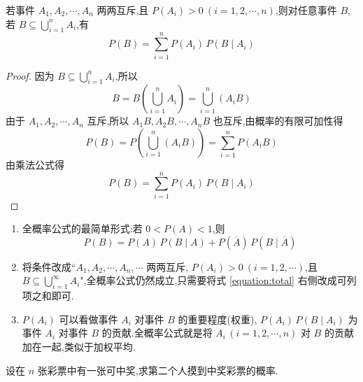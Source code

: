 \begin{theorem}[][全概率公式]
    \indent 若事件 $A_1,A_2,\cdots,A_n$ 两两互斥,且 $P(A_i)>0 \ (i=1,2,\cdots,n)$,则对任意事件 $B$,若 $B \subseteq \displaystyle\bigcup_{i=1}^n A_i$,有
    \begin{equation} \label{equation:total}
        P(B) = \sum_{i=1}^n P(A_i) \, P(B \mid A_i)
    \end{equation}
\end{theorem}

\begin{proof}
    因为 $B \subseteq \displaystyle\bigcup_{i=1}^n A_i$,所以
    $$
    B = B \left( \bigcup_{i=1}^n A_i \right) = \bigcup_{i=1}^n(A_i B)
    $$
    由于 $A_1,A_2,\cdots,A_n$ 互斥,所以 $A_1 B, A_2 B, \cdots, A_n B$ 也互斥,由概率的有限可加性得
    $$
    P(B) = P \left( \bigcup_{i=1}^n (A_i B) \right) = \sum_{i=1}^n P(A_i B)
    $$
    由乘法公式得
    $$
    P(B) = \sum_{i=1}^n P(A_i) \, P(B \mid A_i)
    $$
\end{proof}

\begin{note}
    \begin{enumerate}
        \item 全概率公式的最简单形式:若 $0 < P(A) < 1$,则
        $$
        P(B) = P(A) \, P(B \mid A) + P(\overline{A}) \, P(B \mid \overline{A})
        $$
        \item 将条件改成``$A_1, A_2, \cdots, A_n, \cdots$ 两两互斥, $P(A_i)>0 \ (i=1,2,\cdots)$,且 $B \subseteq \displaystyle\bigcup_{i=1}^{\infty} A_i$",全概率公式仍然成立,只需要将式 \eqref{equation:total} 右侧改成可列项之和即可.
        \item $P(A_i)$ 可以看做事件 $A_i$ 对事件 $B$ 的重要程度(权重), $P(A_i) \, P(B \mid A_i)$ 为事件 $A_i$ 对事件 $B$ 的贡献.全概率公式就是将 $A_i \, (i=1,2,\cdots,n)$ 对 $B$ 的贡献加在一起,类似于加权平均.
    \end{enumerate}
\end{note}

\begin{example}
    \indent 设在 $n$ 张彩票中有一张可中奖,求第二个人摸到中奖彩票的概率.
\end{example}

